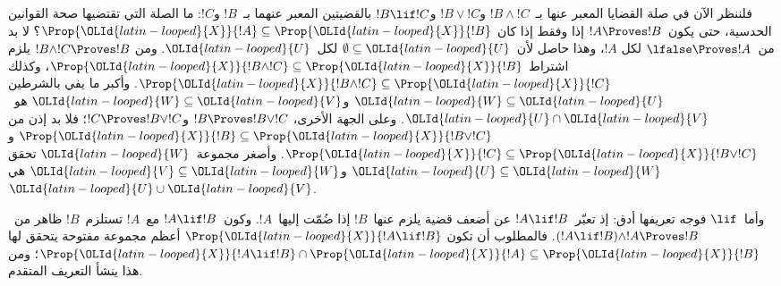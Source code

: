 \documentclass[../../../include/open-logic-section]{subfiles}
\begin{document}
فلننظر الآن في صلة القضايا المعبر عنها بـ~$!B \land !C$ و$!B \lor !C$
و$!B \lif !C$ بالقضيتين المعبر عنهما بـ~$!B$ و$!C$: ما الصلة التي
تقتضيها صحة القوانين الحدسية، حتى يكون~$!A \Proves !B$ إذا وفقط إذا كان
$\Prop{\OLId{latin-looped}{X}}{!A}\subseteq\Prop{\OLId{latin-looped}{X}}{!B}$؟ لا بد من~$\lfalse \Proves !A$ لكل
$!A$، وهذا حاصل لأن~$\emptyset\subseteq \OLId{latin-looped}{U}$ لكل~$\OLId{latin-looped}{U}$. ومن
$!B \land !C \Proves !B$ يلزم اشتراط
$\Prop{\OLId{latin-looped}{X}}{!B \land !C}\subseteq\Prop{\OLId{latin-looped}{X}}{!B}$، وكذلك
$\Prop{\OLId{latin-looped}{X}}{!B \land !C}\subseteq\Prop{\OLId{latin-looped}{X}}{!C}$. وأكبر ما يفي بالشرطين
$\OLId{latin-looped}{W} \subseteq \OLId{latin-looped}{U}$ و$\OLId{latin-looped}{W} \subseteq \OLId{latin-looped}{V}$ هو~$\OLId{latin-looped}{U} \cap \OLId{latin-looped}{V}$. وعلى الجهة الأخرى،
$!B \Proves !B \lor !C$ و$!C \Proves !B \lor !C$؛ فلا بد إذن من
$\Prop{\OLId{latin-looped}{X}}{!B}\subseteq\Prop{\OLId{latin-looped}{X}}{!B \lor !C}$ و
$\Prop{\OLId{latin-looped}{X}}{!C}\subseteq\Prop{\OLId{latin-looped}{X}}{!B \lor !C}$. وأصغر مجموعة~$\OLId{latin-looped}{W}$ تحقق
$\OLId{latin-looped}{U} \subseteq \OLId{latin-looped}{W}$ و$\OLId{latin-looped}{V} \subseteq \OLId{latin-looped}{W}$ هي~$\OLId{latin-looped}{U} \cup \OLId{latin-looped}{V}$.

وأما~$\lif$ فوجه تعريفها أدق: إذ تعبّر~$!A \lif !B$ عن أضعف قضية
يلزم عنها~$!B$ إذا ضُمّت إليها~$!A$. وكون~$!A \lif !B$ مع~$!A$
تستلزم~$!B$ ظاهر من~$(!A \lif !B)\land !A \Proves !B$. فالمطلوب أن تكون
$\Prop{\OLId{latin-looped}{X}}{!A \lif !B}$ أعظم مجموعة مفتوحة يتحقق لها
$\Prop{\OLId{latin-looped}{X}}{!A \lif !B}\cap\Prop{\OLId{latin-looped}{X}}{!A}\subseteq\Prop{\OLId{latin-looped}{X}}{!B}$؛ ومن هذا
ينشأ التعريف المتقدم.
\end{document}
